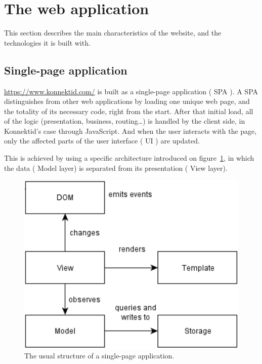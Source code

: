 \section{The web application}
\label{sec:website}

This section describes the main characteristics of the website, and the technologies it is built with.

\subsection{Single-page application}
\label{ssec:spa}

\url{https://www.konnektid.com/} is built as a single-page application (\guillemotleft{} SPA \guillemotright{}).
A SPA distinguishes from other web applications by loading one unique web page, and the totality of its necessary code, right from the start.
After that initial load, all of the logic (presentation, business, routing\ldots) is handled by the client side, in Konnektid's case through JavaScript.
And when the user interacts with the page, only the affected parts of the user interface (\guillemotleft{} UI \guillemotright{}) are updated.

This is achieved by using a specific architecture introduced on {\sc figure}~\ref{fig:spaArchi}, in which the data (\guillemotleft{} Model
\guillemotright{} layer) is separated from its presentation (\guillemotleft{} View \guillemotright{} layer)\cite{spa}.

\begin{figure}[H]
    \centering
    \includegraphics[scale=0.5]{figure/spaArchi.png}
    \caption{The usual structure of a single-page application.}
    \label{fig:spaArchi}
\end{figure}

